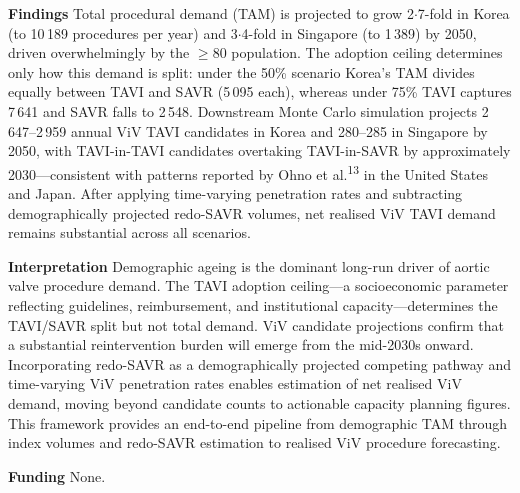\documentclass[10pt, a4paper]{article}
\begin{document}
\begin{lancetpanel}
\vspace{4pt}
\textbf{Findings}\quad
Total procedural demand (TAM) is projected to grow 2$\cdot$7-fold in Korea (to 10\,189 procedures per year) and 3$\cdot$4-fold in Singapore (to 1\,389) by 2050, driven overwhelmingly by the $\geq$80 population. The adoption ceiling determines only how this demand is split: under the 50\% scenario Korea's TAM divides equally between TAVI and SAVR (5\,095 each), whereas under 75\% TAVI captures 7\,641 and SAVR falls to 2\,548. Downstream Monte Carlo simulation projects 2\,647--2\,959 annual ViV TAVI candidates in Korea and 280--285 in Singapore by 2050, with TAVI-in-TAVI candidates overtaking TAVI-in-SAVR by approximately 2030---consistent with patterns reported by Ohno et al.\textsuperscript{13} in the United States and Japan. After applying time-varying penetration rates and subtracting demographically projected redo-SAVR volumes, net realised ViV TAVI demand remains substantial across all scenarios.

\vspace{4pt}
\textbf{Interpretation}\quad
Demographic ageing is the dominant long-run driver of aortic valve procedure demand. The TAVI adoption ceiling---a socioeconomic parameter reflecting guidelines, reimbursement, and institutional capacity---determines the TAVI/SAVR split but not total demand. ViV candidate projections confirm that a substantial reintervention burden will emerge from the mid-2030s onward. Incorporating redo-SAVR as a demographically projected competing pathway and time-varying ViV penetration rates enables estimation of net realised ViV demand, moving beyond candidate counts to actionable capacity planning figures. This framework provides an end-to-end pipeline from demographic TAM through index volumes and redo-SAVR estimation to realised ViV procedure forecasting.

\vspace{4pt}
\textbf{Funding}\quad
None.
\end{lancetpanel}

\vspace{10pt}
\end{document}
